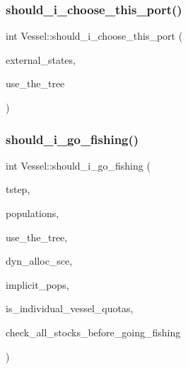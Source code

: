 \subsubsection{\texorpdfstring{should\_i\_choose\_this\_port()}{should\_i\_choose\_this\_port()}}
{\footnotesize\ttfamily int Vessel\+::should\+\_\+i\+\_\+choose\+\_\+this\+\_\+port (\begin{DoxyParamCaption}\item[{std\+::map$<$ std\+::string, int $>$ \&}]{external\+\_\+states,  }\item[{bool}]{use\+\_\+the\+\_\+tree }\end{DoxyParamCaption})}

\mbox{\label{class_vessel_a1c1dea503bfcc8698f3ee7f06dadd0e9}} 
\subsubsection{\texorpdfstring{should\_i\_go\_fishing()}{should\_i\_go\_fishing()}}
{\footnotesize\ttfamily int Vessel\+::should\+\_\+i\+\_\+go\+\_\+fishing (\begin{DoxyParamCaption}\item[{int}]{tstep,  }\item[{std\+::vector$<$ \mbox{\hyperlink{class_population}{Population}} $\ast$ $>$ \&}]{populations,  }\item[{bool}]{use\+\_\+the\+\_\+tree,  }\item[{const \mbox{\hyperlink{class_dyn_alloc_options}{Dyn\+Alloc\+Options}} \&}]{dyn\+\_\+alloc\+\_\+sce,  }\item[{std\+::vector$<$ int $>$ \&}]{implicit\+\_\+pops,  }\item[{int}]{is\+\_\+individual\+\_\+vessel\+\_\+quotas,  }\item[{int}]{check\+\_\+all\+\_\+stocks\+\_\+before\+\_\+going\+\_\+fishing }\end{DoxyParamCaption})}

\mbox{\label{class_vessel_af09b8bb3dd4665fdcf738e5ffac3622e}} 
